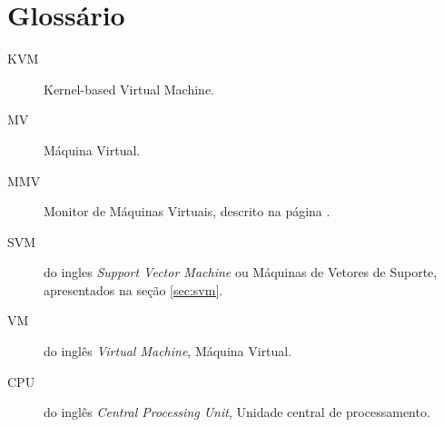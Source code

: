 %
%
\chapter{Glossário}

\begin{description}
\item[KVM] Kernel-based Virtual Machine.
\item[MV] Máquina Virtual.
\item[MMV] Monitor de Máquinas Virtuais, descrito na página \pageref{sec:virt}.
\item[SVM] do ingles \emph{Support Vector Machine} ou Máquinas de Vetores
de Suporte, apresentados na seção \ref{sec:svm}.
\item[VM] do inglês \emph{Virtual Machine}, Máquina Virtual.
\item[CPU] do inglês \emph{Central Processing Unit}, Unidade central de processamento.
\end{description}
